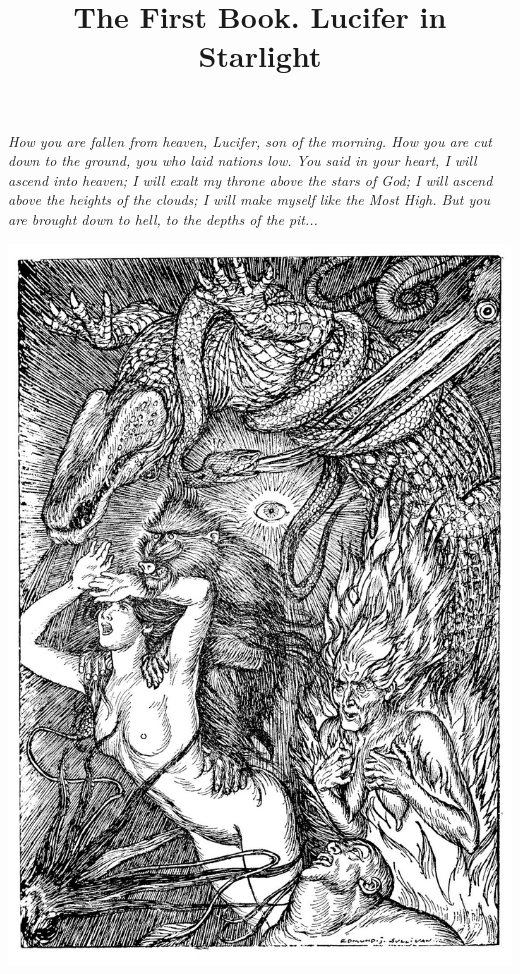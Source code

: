 \documentclass{amsbook}
\title{The First Book. Lucifer in Starlight}
\begin{document}
    \frontmatter
    \renewcommand\thefootnote{{}}
    \maketitle

    \thispagestyle{empty}
    \vspace*{\fill}
    \noindent \textit{How you are fallen from heaven, Lucifer, son of the morning. How you are cut down to the ground, you who laid nations low. You said in your heart, I will ascend into heaven; I will exalt my throne above the stars of God; I will ascend above the heights of the clouds; I will make myself like the Most High. But you are brought down to hell, to the depths of the pit...}
    \vspace*{\fill}
    \clearpage

    \tableofcontents

    \thispagestyle{empty}
    \vspace*{\fill}
    {\centering
    \includegraphics[width=\textwidth]{images/rubaiyat.jpg}}
    \vspace*{\fill}
    \clearpage
\end{document}
